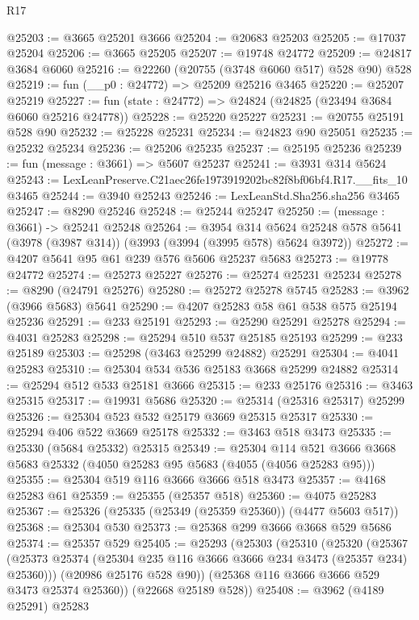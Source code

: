 \begin{lexlean}{R17}
\begin{coremodule}
@25203 := @3665 @25201 @3666
@25204 := @20683 @25203
@25205 := @17037 @25204
@25206 := @3665 @25205
@25207 := @19748 @24772
@25209 := @24817 @3684 @6060
@25216 := @22260 (@20755 (@3748 @6060 @517) @528 @90) @528
@25219 := fun (__p0 : @24772) => @25209 @25216 @3465
@25220 := @25207 @25219
@25227 := fun (state : @24772) => @24824 (@24825 (@23494 @3684 @6060 @25216 @24778))
@25228 := @25220 @25227
@25231 := @20755 @25191 @528 @90
@25232 := @25228 @25231
@25234 := @24823 @90 @25051
@25235 := @25232 @25234
@25236 := @25206 @25235
@25237 := @25195 @25236
@25239 := fun (message : @3661) => @5607 @25237
@25241 := @3931 @314 @5624
@25243 := LexLeanPreserve.C21aec26fe1973919202bc82f8bf06bf4.R17.__fits_10 @3465
@25244 := @3940 @25243
@25246 := LexLeanStd.Sha256.sha256 @3465
@25247 := @8290 @25246
@25248 := @25244 @25247
@25250 := (message : @3661) -> @25241 @25248
@25264 := @3954
    @314
    @5624
    @25248
    @578
    @5641
    (@3978 (@3987 @314))
    (@3993 (@3994 (@3995 @578) @5624 @3972))
@25272 := @4207 @5641 @95 @61 @239 @576 @5606 @25237 @5683
@25273 := @19778 @24772
@25274 := @25273 @25227
@25276 := @25274 @25231 @25234
@25278 := @8290 (@24791 @25276)
@25280 := @25272 @25278 @5745
@25283 := @3962 (@3966 @5683) @5641
@25290 := @4207 @25283 @58 @61 @538 @575 @25194 @25236
@25291 := @233 @25191
@25293 := @25290 @25291 @25278
@25294 := @4031 @25283
@25298 := @25294 @510 @537 @25185 @25193
@25299 := @233 @25189
@25303 := @25298 (@3463 @25299 @24882) @25291
@25304 := @4041 @25283
@25310 := @25304 @534 @536 @25183 @3668 @25299 @24882
@25314 := @25294 @512 @533 @25181 @3666
@25315 := @233 @25176
@25316 := @3463 @25315
@25317 := @19931 @5686
@25320 := @25314 (@25316 @25317) @25299
@25326 := @25304 @523 @532 @25179 @3669 @25315 @25317
@25330 := @25294 @406 @522 @3669 @25178
@25332 := @3463 @518 @3473
@25335 := @25330 (@5684 @25332) @25315
@25349 := @25304
    @114
    @521
    @3666
    @3668
    @5683
    @25332
    (@4050 @25283 @95 @5683 (@4055 (@4056 @25283 @95)))
@25355 := @25304 @519 @116 @3666 @3666 @518 @3473
@25357 := @4168 @25283 @61
@25359 := @25355 (@25357 @518)
@25360 := @4075 @25283
@25367 := @25326 (@25335 (@25349 (@25359 @25360)) (@4477 @5603 @517))
@25368 := @25304 @530
@25373 := @25368 @299 @3666 @3668 @529 @5686
@25374 := @25357 @529
@25405 := @25293
    (@25303
      (@25310
        (@25320
          (@25367 (@25373 @25374 (@25304 @235 @116 @3666 @3666 @234 @3473 (@25357 @234) @25360)))
          (@20986 @25176 @528 @90))
        (@25368 @116 @3666 @3666 @529 @3473 @25374 @25360))
      (@22668 @25189 @528))
@25408 := @3962 (@4189 @25291) @25283

\end{coremodule}
\end{lexlean}
